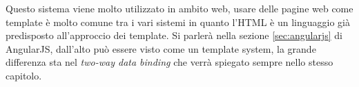 Questo sistema viene molto utilizzato in ambito web, usare delle pagine web come template è molto comune tra i vari sistemi in quanto l'HTML è un linguaggio già predisposto all'approccio dei template. Si parlerà nella sezione \ref{sec:angularjs} di AngularJS, dall'alto può essere visto come un template system, la grande differenza sta nel \emph{two-way data binding} che verrà spiegato sempre nello stesso capitolo.
 




